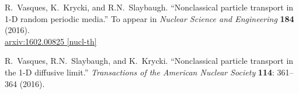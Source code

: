 \documentclass[12pt]{article}
\begin{document}
\begin{thebibliography}{10}
R.~Vasques, K.~Krycki, and R.N.~Slaybaugh.
``Nonclassical particle transport in 1-D random periodic media.''
To appear in \textit{Nuclear Science and Engineering} \textbf{184} (2016).\\
\href{http://arxiv.org/pdf/1602.00825v2.pdf}{arxiv:1602.00825 [nucl-th]} \vspace{-5pt}

R.~Vasques, R.N.~Slaybaugh, and K.~Krycki.
``Nonclassical particle transport in the 1-D diffusive limit.''
\textit{Transactions of the American Nuclear Society} \textbf{114}: 361--364 (2016).
\vspace{-5pt}



\end{thebibliography}
\end{document}

